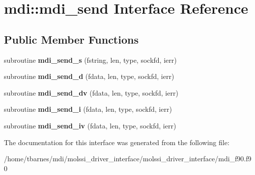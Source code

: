 \hypertarget{interfacemdi_1_1mdi__send}{\section{mdi\-:\-:mdi\-\_\-send Interface Reference}
\label{interfacemdi_1_1mdi__send}
}
\subsection*{Public Member Functions}
\begin{DoxyCompactItemize}
\item 
\hypertarget{interfacemdi_1_1mdi__send_a3ddadb7d7d6c6c71986251adc8658fb7}{subroutine {\bfseries mdi\-\_\-send\-\_\-s} (fstring, len, type, sockfd, ierr)}\label{interfacemdi_1_1mdi__send_a3ddadb7d7d6c6c71986251adc8658fb7}

\item 
\hypertarget{interfacemdi_1_1mdi__send_af2e36516f7aaa3233d73305279d81504}{subroutine {\bfseries mdi\-\_\-send\-\_\-d} (fdata, len, type, sockfd, ierr)}\label{interfacemdi_1_1mdi__send_af2e36516f7aaa3233d73305279d81504}

\item 
\hypertarget{interfacemdi_1_1mdi__send_a4353240dcf91e1081c3f8c8b6093258e}{subroutine {\bfseries mdi\-\_\-send\-\_\-dv} (fdata, len, type, sockfd, ierr)}\label{interfacemdi_1_1mdi__send_a4353240dcf91e1081c3f8c8b6093258e}

\item 
\hypertarget{interfacemdi_1_1mdi__send_aa33ab4f1c856362420d6319d61e49806}{subroutine {\bfseries mdi\-\_\-send\-\_\-i} (fdata, len, type, sockfd, ierr)}\label{interfacemdi_1_1mdi__send_aa33ab4f1c856362420d6319d61e49806}

\item 
\hypertarget{interfacemdi_1_1mdi__send_a6b75e458ac31ee62040de3c1487d372a}{subroutine {\bfseries mdi\-\_\-send\-\_\-iv} (fdata, len, type, sockfd, ierr)}\label{interfacemdi_1_1mdi__send_a6b75e458ac31ee62040de3c1487d372a}

\end{DoxyCompactItemize}


The documentation for this interface was generated from the following file\-:\begin{DoxyCompactItemize}
\item 
/home/tbarnes/mdi/molssi\-\_\-driver\-\_\-interface/molssi\-\_\-driver\-\_\-interface/mdi\-\_\-f90.\-f90\end{DoxyCompactItemize}

